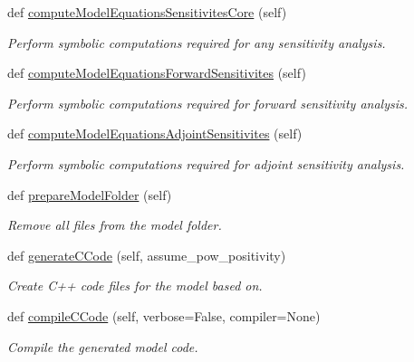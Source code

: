 \begin{DoxyCompactItemize}
def \mbox{\hyperlink{classamici_1_1sbml__import_1_1_sbml_importer_a1f587cc58599d48e31ce68804357b142}{compute\+Model\+Equations\+Sensitivites\+Core}} (self)
\begin{DoxyCompactList}\small\item\em Perform symbolic computations required for any sensitivity analysis. \end{DoxyCompactList}\item 
def \mbox{\hyperlink{classamici_1_1sbml__import_1_1_sbml_importer_a37b86397a43aca4fa926c6cfe6831f77}{compute\+Model\+Equations\+Forward\+Sensitivites}} (self)
\begin{DoxyCompactList}\small\item\em Perform symbolic computations required for forward sensitivity analysis. \end{DoxyCompactList}\item 
def \mbox{\hyperlink{classamici_1_1sbml__import_1_1_sbml_importer_a3a4c18dff314f187d61553ee60a7c45e}{compute\+Model\+Equations\+Adjoint\+Sensitivites}} (self)
\begin{DoxyCompactList}\small\item\em Perform symbolic computations required for adjoint sensitivity analysis. \end{DoxyCompactList}\item 
def \mbox{\hyperlink{classamici_1_1sbml__import_1_1_sbml_importer_a39c6b169618d16df62686f18aa92db75}{prepare\+Model\+Folder}} (self)
\begin{DoxyCompactList}\small\item\em Remove all files from the model folder. \end{DoxyCompactList}\item 
def \mbox{\hyperlink{classamici_1_1sbml__import_1_1_sbml_importer_ab36c229db61f3892cc5ae1b29d56940f}{generate\+C\+Code}} (self, assume\+\_\+pow\+\_\+positivity)
\begin{DoxyCompactList}\small\item\em Create C++ code files for the model based on. \end{DoxyCompactList}\item 
def \mbox{\hyperlink{classamici_1_1sbml__import_1_1_sbml_importer_ae3542bf042c5054d80091f219ef917f7}{compile\+C\+Code}} (self, verbose=False, compiler=None)
\begin{DoxyCompactList}\small\item\em Compile the generated model code. \end{DoxyCompactList}\item 

\end{DoxyCompactItemize}

